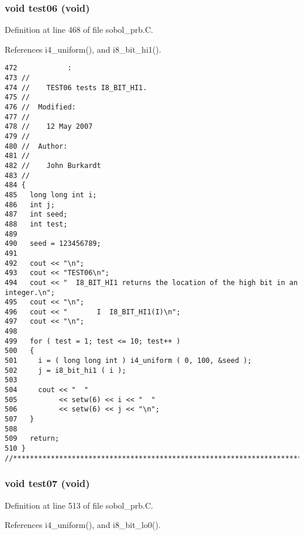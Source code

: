 \subsubsection{\setlength{\rightskip}{0pt plus 5cm}void test06 (void)}\label{sobol__prb_8C_23a600ccf24c6346dd35868e3b42450a}




Definition at line 468 of file sobol\_\-prb.C.

References i4\_\-uniform(), and i8\_\-bit\_\-hi1().

\begin{Code}\begin{verbatim}472            :
473 //
474 //    TEST06 tests I8_BIT_HI1.
475 //
476 //  Modified:
477 //
478 //    12 May 2007
479 //
480 //  Author:
481 //
482 //    John Burkardt
483 //
484 {
485   long long int i;
486   int j;
487   int seed;
488   int test;
489 
490   seed = 123456789;
491 
492   cout << "\n";
493   cout << "TEST06\n";
494   cout << "  I8_BIT_HI1 returns the location of the high bit in an integer.\n";
495   cout << "\n";
496   cout << "       I  I8_BIT_HI1(I)\n";
497   cout << "\n";
498 
499   for ( test = 1; test <= 10; test++ )
500   {
501     i = ( long long int ) i4_uniform ( 0, 100, &seed );
502     j = i8_bit_hi1 ( i );
503 
504     cout << "  "
505          << setw(6) << i << "  "
506          << setw(6) << j << "\n";
507   }
508 
509   return;
510 }
//****************************************************************************80
\end{verbatim}
\end{Code}


\subsubsection{\setlength{\rightskip}{0pt plus 5cm}void test07 (void)}\label{sobol__prb_8C_3909542e3ee8d3c6674db055cd586904}




Definition at line 513 of file sobol\_\-prb.C.

References i4\_\-uniform(), and i8\_\-bit\_\-lo0().

